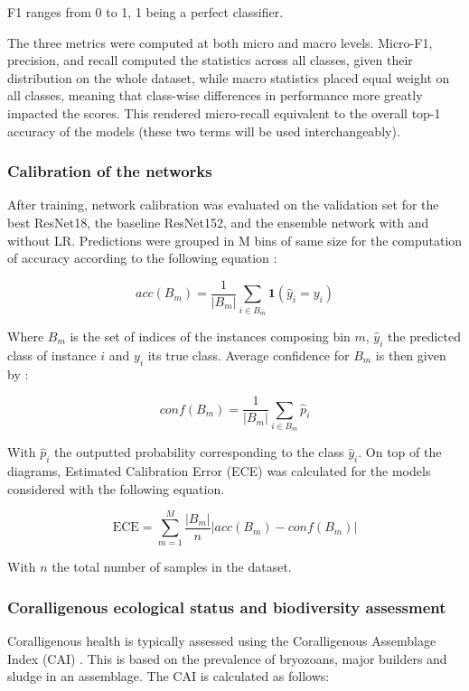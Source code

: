 F1 ranges from 0 to 1, 1 being a perfect classifier.

The three metrics were computed at both micro and macro levels. Micro-F1, precision, and recall computed the statistics across all classes, given their distribution on the whole dataset, while macro statistics placed equal weight on all classes, meaning that class-wise differences in performance more greatly impacted the scores. This rendered micro-recall equivalent to the overall top-1 accuracy of the models (these two terms will be used interchangeably).

\subsubsection{Calibration of the networks}\label{chapitre1_5.2.2}

After training, network calibration was evaluated on the validation set for the best ResNet18, the baseline ResNet152, and the ensemble network with and without LR. Predictions were grouped in M bins of same size for the computation of accuracy according to the following equation \citep{guo_calibration_2017}:

\begin{equation}
	acc(B_m)=\frac{1}{|B_m|}\sum_{i\in B_m}\textbf{1}(\hat{y}_i=y_i)
\end{equation}

Where $B_m$ is the set of indices of the instances composing bin $m$, $\hat{y}_i$ the predicted class of instance $i$ and $y_i$ its true class. Average confidence for $B_m$ is then given by :

\begin{equation}
conf(B_m)=\frac{1}{|B_m|}\sum_{i\in B_m}\hat{p}_i
\end{equation}

With $\hat{p}_i$ the outputted probability corresponding to the class $\hat{y}_i$. On top of the diagrams, Estimated Calibration Error (ECE) was calculated for the models considered with the following equation.

\begin{equation}
\text{ECE}=\sum_{m=1}^{M}\frac{|B_m|}{n}|acc(B_m)-conf(B_m)|
\end{equation}

With $n$ the total number of samples in the dataset.


\subsubsection{Coralligenous ecological status and biodiversity assessment}\label{chapitre1_5.2.3}
Coralligenous health is typically assessed using the Coralligenous Assemblage Index (CAI) \citep{deter_preliminary_2012}. This is based on the prevalence of bryozoans, major builders and sludge in an assemblage. The CAI is calculated as follows:

